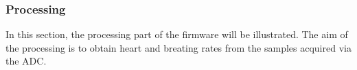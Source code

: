 \documentclass[twoside, twocolumn, spanish] {article}
\begin{document}
\begin{figure}[h]
\centering
{} 
\hspace{0.2cm}
\caption{} 
\label{flowcharts}
\end{figure}

\subsubsection{Processing}
In this section, the processing part of the firmware will be illustrated. The aim of the processing is to obtain heart and breating rates from the samples acquired via the ADC. \\
\end{document}
